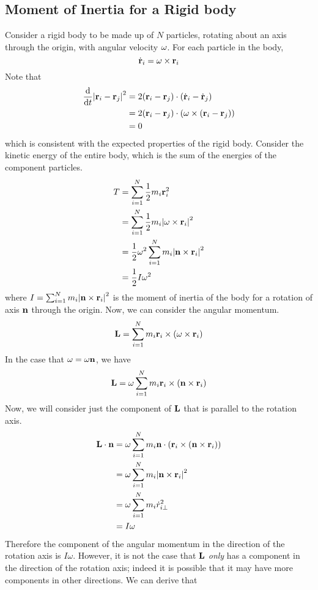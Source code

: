 \documentclass{article}
\begin{document}
\subsection{Moment of Inertia for a Rigid body}
Consider a rigid body to be made up of $N$ particles, rotating about an axis through the origin, with angular velocity $\vb \omega$. For each particle in the body,
\[ \dot{\vb r}_i = \vb \omega \times \vb r_i \]
Note that
\begin{align*}
	\dv{t} \abs{\vb r_i - \vb r_j}^2 & = 2(\vb r_i - \vb r_j) \cdot (\dot{\vb r}_i - \dot{\vb r}_j)                 \\
	                                 & = 2(\vb r_i - \vb r_j) \cdot (\omega \times (\vb r_i - \vb r_j)) \\
	                                 & = 0
\end{align*}
which is consistent with the expected properties of the rigid body. Consider the kinetic energy of the entire body, which is the sum of the energies of the component particles.
\begin{align*}
	T & = \sum_{i=1}^N \frac{1}{2}m_i \vb r_i^2                              \\
	  & = \sum_{i=1}^N \frac{1}{2}m_i \abs{\vb\omega \times \vb r_i}^2       \\
	  & = \frac{1}{2} \omega^2 \sum_{i=1}^N m_i \abs{\vb n \times \vb r_i}^2 \\
	  & = \frac{1}{2}I\omega^2
\end{align*}
where $I = \sum_{i=1}^N m_i \abs{\vb n \times \vb r_i}^2$ is the moment of inertia of the body for a rotation of axis $\vb n$ through the origin. Now, we can consider the angular momentum.
\[ \vb L = \sum_{i=1}^N m_i \vb r_i \times (\vb \omega \times \vb r_i) \]
In the case that $\vb\omega = \omega \vb n$, we have
\[ \vb L = \omega \sum_{i=1}^N m_i \vb r_i \times (\vb n \times \vb r_i) \]
Now, we will consider just the component of $\vb L$ that is parallel to the rotation axis.
\begin{align*}
	\vb L \cdot \vb n & = \omega \sum_{i=1}^N m_i \vb n \cdot (\vb r_i \times (\vb n \times \vb r_i)) \\
	                  & = \omega\sum_{i=1}^N m_i \abs{ \vb n \times \vb r_i }^2                       \\
	                  & = \omega\sum_{i=1}^N m_i {\dot r}_{i\perp}^2                                  \\
	                  & = I\omega
\end{align*}
Therefore the component of the angular momentum in the direction of the rotation axis is $I\omega$. However, it is not the case that $\vb L$ \textit{only} has a component in the direction of the rotation axis; indeed it is possible that it may have more components in other directions. We can derive that
\end{document}
